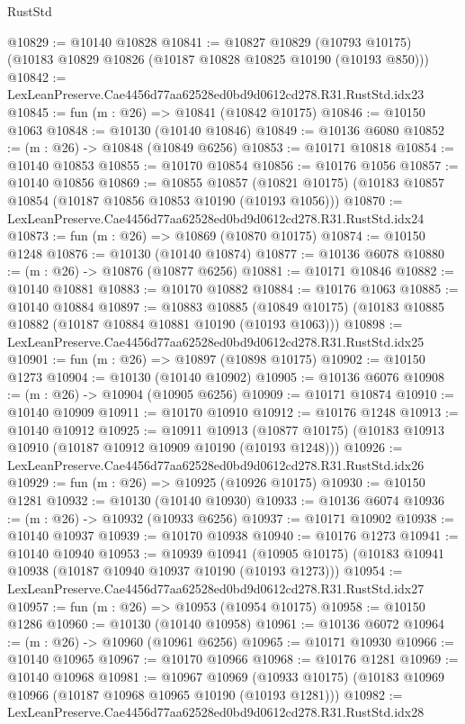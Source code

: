 \begin{lexlean}{RustStd}
\begin{coremodule}
@10829 := @10140 @10828
@10841 := @10827
    @10829
    (@10793 @10175)
    (@10183 @10829 @10826 (@10187 @10828 @10825 @10190 (@10193 @850)))
@10842 := LexLeanPreserve.Cae4456d77aa62528ed0bd9d0612cd278.R31.RustStd.idx23
@10845 := fun (m : @26) => @10841 (@10842 @10175)
@10846 := @10150 @1063
@10848 := @10130 (@10140 @10846)
@10849 := @10136 @6080
@10852 := (m : @26) -> @10848 (@10849 @6256)
@10853 := @10171 @10818
@10854 := @10140 @10853
@10855 := @10170 @10854
@10856 := @10176 @1056
@10857 := @10140 @10856
@10869 := @10855
    @10857
    (@10821 @10175)
    (@10183 @10857 @10854 (@10187 @10856 @10853 @10190 (@10193 @1056)))
@10870 := LexLeanPreserve.Cae4456d77aa62528ed0bd9d0612cd278.R31.RustStd.idx24
@10873 := fun (m : @26) => @10869 (@10870 @10175)
@10874 := @10150 @1248
@10876 := @10130 (@10140 @10874)
@10877 := @10136 @6078
@10880 := (m : @26) -> @10876 (@10877 @6256)
@10881 := @10171 @10846
@10882 := @10140 @10881
@10883 := @10170 @10882
@10884 := @10176 @1063
@10885 := @10140 @10884
@10897 := @10883
    @10885
    (@10849 @10175)
    (@10183 @10885 @10882 (@10187 @10884 @10881 @10190 (@10193 @1063)))
@10898 := LexLeanPreserve.Cae4456d77aa62528ed0bd9d0612cd278.R31.RustStd.idx25
@10901 := fun (m : @26) => @10897 (@10898 @10175)
@10902 := @10150 @1273
@10904 := @10130 (@10140 @10902)
@10905 := @10136 @6076
@10908 := (m : @26) -> @10904 (@10905 @6256)
@10909 := @10171 @10874
@10910 := @10140 @10909
@10911 := @10170 @10910
@10912 := @10176 @1248
@10913 := @10140 @10912
@10925 := @10911
    @10913
    (@10877 @10175)
    (@10183 @10913 @10910 (@10187 @10912 @10909 @10190 (@10193 @1248)))
@10926 := LexLeanPreserve.Cae4456d77aa62528ed0bd9d0612cd278.R31.RustStd.idx26
@10929 := fun (m : @26) => @10925 (@10926 @10175)
@10930 := @10150 @1281
@10932 := @10130 (@10140 @10930)
@10933 := @10136 @6074
@10936 := (m : @26) -> @10932 (@10933 @6256)
@10937 := @10171 @10902
@10938 := @10140 @10937
@10939 := @10170 @10938
@10940 := @10176 @1273
@10941 := @10140 @10940
@10953 := @10939
    @10941
    (@10905 @10175)
    (@10183 @10941 @10938 (@10187 @10940 @10937 @10190 (@10193 @1273)))
@10954 := LexLeanPreserve.Cae4456d77aa62528ed0bd9d0612cd278.R31.RustStd.idx27
@10957 := fun (m : @26) => @10953 (@10954 @10175)
@10958 := @10150 @1286
@10960 := @10130 (@10140 @10958)
@10961 := @10136 @6072
@10964 := (m : @26) -> @10960 (@10961 @6256)
@10965 := @10171 @10930
@10966 := @10140 @10965
@10967 := @10170 @10966
@10968 := @10176 @1281
@10969 := @10140 @10968
@10981 := @10967
    @10969
    (@10933 @10175)
    (@10183 @10969 @10966 (@10187 @10968 @10965 @10190 (@10193 @1281)))
@10982 := LexLeanPreserve.Cae4456d77aa62528ed0bd9d0612cd278.R31.RustStd.idx28

\end{coremodule}
\end{lexlean}
